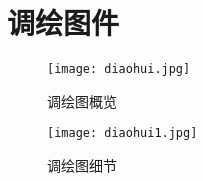 \section{调绘图件}

\begin{figure}[htbp]
\centering
\caption{调绘图概览}
\texttt{[image: diaohui.jpg]}
\end{figure}

\begin{figure}[htbp]
\centering
\caption{调绘图细节}
\texttt{[image: diaohui1.jpg]}
\end{figure}
